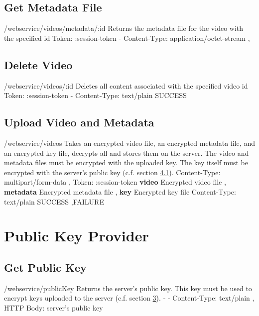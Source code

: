 \documentclass{report}
\begin{document}
\section{Get Metadata File}

 {/webservice/videos/metadata/:id}
   {Returns the metadata file for the video with the specified id}
   {Token: :session-token}
   {-}
   {Content-Type: application/octet-stream}
   { \sep {}}
   
\section{Delete Video}

 {/webservice/videos/:id}
   {Deletes all content associated with the specified video id}
   {Token: :session-token}
   {-}
   {Content-Type: text/plain}
   {SUCCESS}
   
\section{Upload Video and Metadata} \label{UploadVideo}

 {/webservice/videos}
   {Takes an encrypted video file, an encrypted metadata file, and an encrypted key file, decrypts all and stores them on the server. The video and metadata files must be encrypted with the uploaded key. The key itself must be encrypted with the server's public key (c.f. section \ref{PublicKey}).}
   {Content-Type: multipart/form-data \sep
   Token: :session-token}
   {\textbf{video} Encrypted video file \sep
   \textbf{metadata} Encrypted metadata file \sep
   \textbf{key} Encrypted key file}
   {Content-Type: text/plain}
   {SUCCESS \sep FAILURE}
   
\chapter{Public Key Provider}

\section{Get Public Key} \label{PublicKey}

 {/webservice/publicKey}
   {Returns the server's public key. This key must be used to encrypt keys uploaded to the server (c.f. section \ref{UploadVideo}).}
   {-}
   {-}
   {Content-Type: text/plain \sep
   HTTP Body: server's public key}
   {}
   
\end{document}
